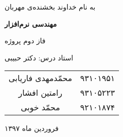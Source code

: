 \begin{center}
\large
به نام خداوند بخشنده‌ی مهربان

\Huge
\vspace*{3cm}
\textbf{مهندسی نرم‌افزار}

\vspace*{1cm}
\large
فاز دوم پروژه
\vspace*{3cm}

\Large
استاد درس: دکتر حبیبی
\vspace*{2cm}

\vspace*{1cm}

\begin{tabular}{cc}
 محمّدمهدی فاریابی
	& 
۹۳۱۰۱۹۵۱
	\\
رامتین افشار
	&
۹۳۱۰۵۲۲۳
	 \\
محمّد خوبی
	&
۹۲۱۰۱۸۷۴
	 \\
\end{tabular}

 

\vspace*{3cm} 
\large

فروردین ماه ۱۳۹۷
\vspace*{5cm}

\end{center}
\newpage

